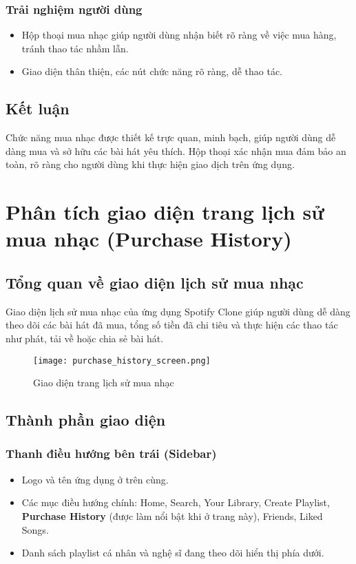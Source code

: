 \documentclass{book}
\let\oldsection\section
\renewcommand{\section}{\clearpage\oldsection}
\begin{document}
\subsubsection{Trải nghiệm người dùng}
\begin{itemize}
    \item Hộp thoại mua nhạc giúp người dùng nhận biết rõ ràng về việc mua hàng, tránh thao tác nhầm lẫn.
    \item Giao diện thân thiện, các nút chức năng rõ ràng, dễ thao tác.
\end{itemize}

\subsection{Kết luận}
Chức năng mua nhạc được thiết kế trực quan, minh bạch, giúp người dùng dễ dàng mua và sở hữu các bài hát yêu thích. Hộp thoại xác nhận mua đảm bảo an toàn, rõ ràng cho người dùng khi thực hiện giao dịch trên ứng dụng.

\section{Phân tích giao diện trang lịch sử mua nhạc (Purchase History)}

\subsection{Tổng quan về giao diện lịch sử mua nhạc}
Giao diện lịch sử mua nhạc của ứng dụng Spotify Clone giúp người dùng dễ dàng theo dõi các bài hát đã mua, tổng số tiền đã chi tiêu và thực hiện các thao tác như phát, tải về hoặc chia sẻ bài hát.

\begin{figure}[h!]
\centering
\texttt{[image: purchase\_history\_screen.png]} %
\caption{Giao diện trang lịch sử mua nhạc}
\label{fig:purchasehistory}
\end{figure}

\subsection{Thành phần giao diện}

\subsubsection{Thanh điều hướng bên trái (Sidebar)}
\begin{itemize}
    \item Logo và tên ứng dụng ở trên cùng.
    \item Các mục điều hướng chính: Home, Search, Your Library, Create Playlist, \textbf{Purchase History} (được làm nổi bật khi ở trang này), Friends, Liked Songs.
    \item Danh sách playlist cá nhân và nghệ sĩ đang theo dõi hiển thị phía dưới.
\end{itemize}
\end{document}
